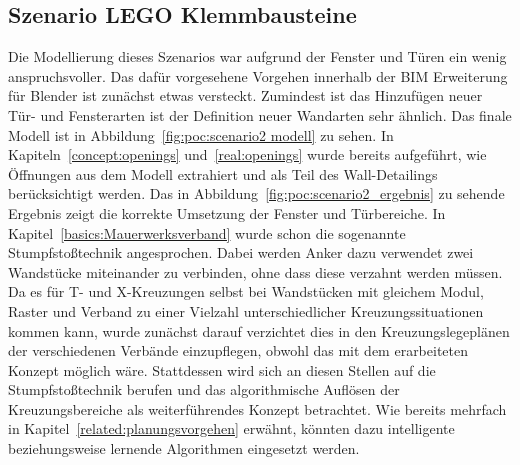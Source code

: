 \subsection{Szenario LEGO Klemmbausteine}\label{poc:scenario2}
Die Modellierung dieses Szenarios war aufgrund der Fenster und Türen ein wenig anspruchsvoller.
Das dafür vorgesehene Vorgehen innerhalb der BIM Erweiterung für Blender ist zunächst etwas versteckt.
Zumindest ist das Hinzufügen neuer Tür- und Fensterarten ist der Definition neuer Wandarten sehr ähnlich.
Das finale Modell ist in Abbildung~\ref{fig:poc:scenario2 modell} zu sehen.
In Kapiteln~\ref{concept:openings} und~\ref{real:openings} wurde bereits aufgeführt, wie Öffnungen aus dem Modell extrahiert und als Teil des Wall-Detailings berücksichtigt werden.
Das in Abbildung~\ref{fig:poc:scenario2_ergebnis} zu sehende Ergebnis zeigt die korrekte Umsetzung der Fenster und Türbereiche.
In Kapitel~\ref{basics:Mauerwerksverband} wurde schon die sogenannte \glqq{}Stumpfstoßtechnik\grqq{} angesprochen.
Dabei werden Anker dazu verwendet zwei Wandstücke miteinander zu verbinden, ohne dass diese verzahnt werden müssen.
Da es für T- und X-Kreuzungen selbst bei Wandstücken mit gleichem Modul, Raster und Verband zu einer Vielzahl unterschiedlicher Kreuzungssituationen kommen kann, wurde zunächst darauf verzichtet dies in den Kreuzungslegeplänen der verschiedenen Verbände einzupflegen, obwohl das mit dem erarbeiteten Konzept möglich wäre.
Stattdessen wird sich an diesen Stellen auf die Stumpfstoßtechnik berufen und das algorithmische Auflösen der Kreuzungsbereiche als weiterführendes Konzept betrachtet.
Wie bereits mehrfach in Kapitel~\ref{related:planungsvorgehen} erwähnt, könnten dazu \glqq{}intelligente\grqq{} beziehungsweise lernende Algorithmen eingesetzt werden.

